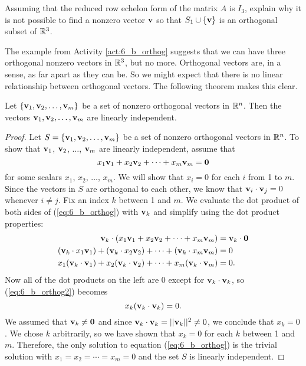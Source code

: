 \begin{activity}
	\item Assuming that the reduced row echelon form of the matrix $A$ is $I_3$, explain why it is not possible to find a nonzero vector $\mathbf{v}$ so that $S_1 \cup \{\mathbf{v}\}$ is an orthogonal subset of $\mathbb{R}^3$. 
		

	
	\ea
\end{activity}


The example from Activity \ref{act:6_b_orthog} suggests that we can have three orthogonal nonzero vectors in $\mathbb{R}^3$, but no more. Orthogonal vectors are, in a sense, as far apart as they can be. So we might expect that there is no linear relationship between orthogonal vectors. The following theorem makes this clear.

\begin{theorem} \label{thm:6_b_Orth_li} Let $\{\mathbf{v}_1, \mathbf{v}_2, \ldots, \mathbf{v}_m\}$ be a set of nonzero orthogonal vectors in $\mathbb{R}^n$. Then the vectors $\mathbf{v}_1, \mathbf{v}_2, \ldots, \mathbf{v}_m$ are linearly independent.
\end{theorem}

\begin{proof} Let $S = \{\mathbf{v}_1, \mathbf{v}_2, \ldots, \mathbf{v}_m\}$ be a set of nonzero orthogonal vectors in $\mathbb{R}^n$. To show that $\mathbf{v}_1$, $\mathbf{v}_2$, $\ldots$, $\mathbf{v}_m$ are linearly independent, assume that
\begin{equation}
x_1\mathbf{v}_1 + x_2\mathbf{v}_2 + \cdots + x_m \mathbf{v}_m = \mathbf{0} \label{eq:6_b_orthog}
\end{equation}
for some scalars $x_1$, $x_2$, $\ldots$, $x_m$. We will show that $x_i = 0$ for each $i$ from 1 to $m$. Since the vectors in $S$ are orthogonal  to each other, we know that $\mathbf{v}_i \cdot \mathbf{v}_j = 0$ whenever $i \neq j$. Fix an index $k$ between 1 and $m$. We evaluate the dot product of both sides of (\ref{eq:6_b_orthog}) with $\mathbf{v}_k$ and simplify using the dot product properties:
\begin{align}
\mathbf{v}_k \cdot (x_1\mathbf{v}_1 + x_2\mathbf{v}_2 + \cdots + x_m \mathbf{v}_m) &= \mathbf{v}_k \cdot \mathbf{0}  \notag \\
(\mathbf{v}_k \cdot x_1\mathbf{v}_1) + (\mathbf{v}_k \cdot x_2\mathbf{v}_2) + \cdots + (\mathbf{v}_k \cdot x_m \mathbf{v}_m) &= 0 \notag \\
x_1(\mathbf{v}_k \cdot \mathbf{v}_1) + x_2(\mathbf{v}_k \cdot \mathbf{v}_2) + \cdots + x_m(\mathbf{v}_k \cdot  \mathbf{v}_m) &= 0. \label{eq:6_b_orthog2}
\end{align}
Now all of the dot products on the left are 0 except for $\mathbf{v}_k \cdot \mathbf{v}_k$, so (\ref{eq:6_b_orthog2}) becomes
\[x_k (\mathbf{v}_k \cdot \mathbf{v}_k) = 0.\]
We assumed that $\mathbf{v}_k \neq \mathbf{0}$ and since $\mathbf{v}_k \cdot \mathbf{v}_k = || \mathbf{v}_k ||^2 \neq 0$, we conclude that $x_k = 0$. We chose $k$ arbitrarily, so we have shown that $x_k =0$ for each $k$ between 1 and $m$. Therefore, the only solution to equation (\ref{eq:6_b_orthog}) is the trivial solution with $x_1 = x_2 = \cdots = x_m = 0$ and the set $S$ is linearly independent.
\end{proof}


